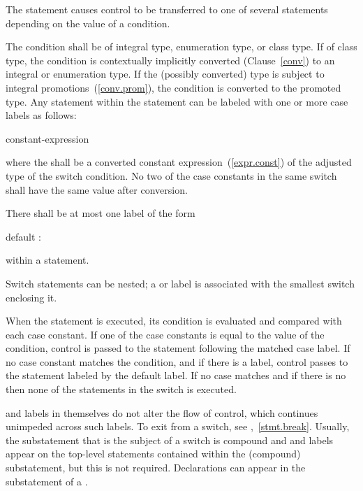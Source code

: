\pnum
The  statement causes control to be transferred to one of
several statements depending on the value of a condition.

\pnum
The condition shall be of integral type, enumeration type, or class
type. If of class type, the
condition is contextually implicitly converted (Clause~\ref{conv}) to
an integral or enumeration type.
If the (possibly converted) type is subject to integral
promotions~(\ref{conv.prom}), the condition is converted
to the promoted type. 
Any
statement within the  statement can be labeled with one or
more case labels as follows:

\begin{ncbnf}
%
 constant-expression \terminal{:}
\end{ncbnf}

where the  shall be
a converted constant expression~(\ref{expr.const}) of the
adjusted type of the switch condition. No two of the case constants in
the same switch shall have the same value after conversion.

\pnum
{}%
There shall be at most one label of the form

\begin{codeblock}
default :
\end{codeblock}

within a  statement.

\pnum
Switch statements can be nested; a  or  label
is associated with the smallest switch enclosing it.

\pnum
When the  statement is executed, its condition is
evaluated and compared with each case constant.
%
If one of the case constants is equal to the value of the condition,
control is passed to the statement following the matched case label. If
no case constant matches the condition, and if there is a
%
 label, control passes to the statement labeled by the
default label. If no case matches and if there is no 
then none of the statements in the switch is executed.

\pnum
{} and  labels in themselves do not alter the
flow of control, which continues unimpeded across such labels. To exit
from a switch, see ,~\ref{stmt.break}.
\enternote
Usually, the substatement that is the subject of a switch is compound
and  and  labels appear on the top-level
statements contained within the (compound) substatement, but this is not
required.
%
Declarations can appear in the substatement of a
.
\exitnote%

